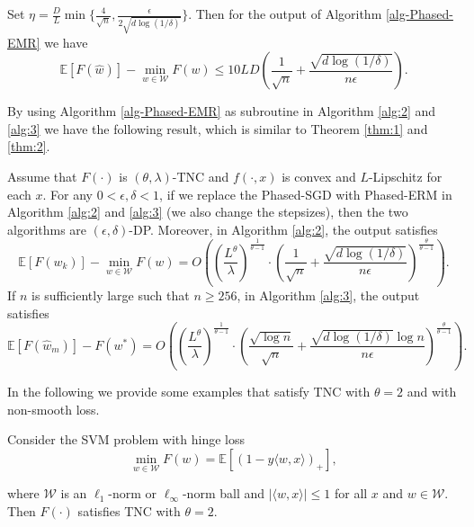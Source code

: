 \documentclass[12pt]{alt2022} %
\begin{document}
\begin{lemma}
    Set $\eta=\frac{D}{L}\min\{\frac{4}{\sqrt{n}}, \frac{\epsilon}{2\sqrt{d\log(1/\delta)}}\}$. Then for the output of Algorithm \ref{alg-Phased-EMR} we have 
    \begin{equation*}
	\mathbb{E}[F(\hat{w})]-\min_{w\in \mathcal{W}}F(w)\leq 10LD\left(\frac{1}{\sqrt{n}}+\frac{\sqrt{d\log(1/\delta)}}{ n\epsilon}\right). 
    \end{equation*}
\end{lemma}
By using Algorithm \ref{alg-Phased-EMR} as subroutine in Algorithm \ref{alg:2} and \ref{alg:3} we have the following result, which is similar to Theorem \ref{thm:1} and \ref{thm:2}. 
\begin{theorem}\label{thm:5}
   	Assume that $F(\cdot)$ is $(\theta, \lambda)$-TNC and $f(\cdot, x)$ is  convex and $L$-Lipschitz for each $x$. For any $0<\epsilon, \delta<1$, if we replace the Phased-SGD with Phased-ERM in Algorithm \ref{alg:2} and \ref{alg:3} (we also change the stepsizes), then the two algorithms are $(\epsilon, \delta)$-DP. Moreover, in Algorithm \ref{alg:2},  the output satisfies
		\begin{equation*}
	\mathbb{E} [F(w_k)]-\min_{w\in \mathcal{W}} F(w)= O\left(\left(\frac{L^{\theta}}{\lambda}\right)^{\frac{1}{\theta -1}}\cdot\left(\frac{1}{\sqrt{n}}+\frac{\sqrt{d\log(1/\delta)}}{ n\epsilon }\right)^{\frac{\theta}{\theta-1}}\right). 
		\end{equation*} 
		If $n$ is sufficiently large such that $n\geq256$,  in Algorithm \ref{alg:3},  the output satisfies
		\begin{equation*}
\mathbb{E}[F(\hat{w}_m)]-F(w^*)= O\left(\left(\frac{L^\theta}{\lambda}\right)^{\frac{1}{\theta-1}}\cdot\left(\frac{\sqrt{\log n}}{\sqrt{n}}+\frac{\sqrt{d\log(1/\delta)}\log n}{n\epsilon}\right)^{\frac{\theta}{\theta-1}}\right).
\end{equation*}
\end{theorem}
In the following we provide some examples that satisfy TNC  with $\theta=2$ and with non-smooth loss. 
\begin{lemma}
    Consider the SVM problem with hinge loss
    \begin{equation*}
        \min_{w\in\mathcal{W}}F(w)=\mathbb{E}[(1-y\langle w ,x \rangle)_{+}], 
    \end{equation*}
\end{lemma}
where $\mathcal{W}$ is an $\ell_1$-norm or $\ell_\infty$-norm ball and $|\langle w, x\rangle|\leq 1$ for all $x$ and $w\in \mathcal{W}$. Then $F(\cdot)$ satisfies TNC with $\theta=2$. 
\end{document}
